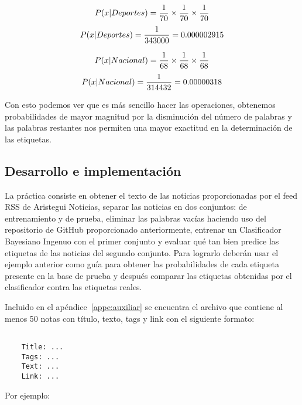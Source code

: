\[ P(x | Deportes) = {1 \over 70} \times {1 \over 70} \times {1 \over 70} \]
\[ P(x | Deportes) = { 1 \over 343000 } = 0.000002915 \]

\[ P(x | Nacional) = {1 \over 68} \times {1 \over 68} \times {1 \over 68} \]
\[ P(x | Nacional) = { 1 \over 314432 } = 0.00000318 \]

Con esto podemos ver que es más sencillo hacer las operaciones, obtenemos probabilidades de mayor magnitud por la disminución del número de palabras y las palabras restantes nos permiten una mayor exactitud en la determinación de las etiquetas.

\subsection{Desarrollo e implementaci\'on}

La práctica consiste en obtener el texto de las noticias proporcionadas por el feed RSS de Aristegui Noticias, separar las noticias en dos conjuntos: de entrenamiento y de prueba, eliminar las palabras vacías haciendo uso del repositorio de GitHub proporcionado anteriormente, entrenar un Clasificador Bayesiano Ingenuo con el primer conjunto y evaluar qué tan bien predice las etiquetas de las noticias del segundo conjunto. Para lograrlo deberán usar el ejemplo anterior como guía para obtener las probabilidades de cada etiqueta presente en la base de prueba y después comparar las etiquetas obtenidas por el clasificador contra las etiquetas reales.

Incluido en el apéndice~\ref{appe:auxiliar} se encuentra el archivo  que contiene al menos 50 notas con título, texto, tags y link con el siguiente formato:

\begin{verbatim}

    Title: ...
    Tags: ...
    Text: ...
    Link: ...

\end{verbatim}

Por ejemplo:

